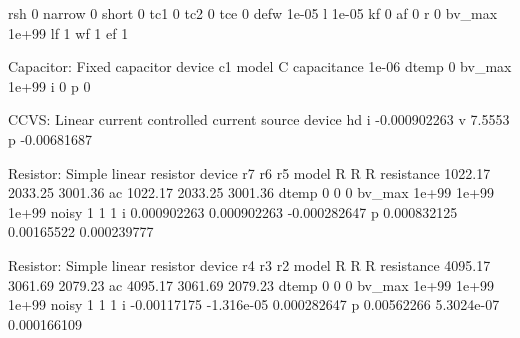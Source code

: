         rsh                     0
     narrow                     0
      short                     0
        tc1                     0
        tc2                     0
        tce                     0
       defw                 1e-05
          l                 1e-05
         kf                     0
         af                     0
          r                     0
     bv_max                 1e+99
         lf                     1
         wf                     1
         ef                     1

 Capacitor: Fixed capacitor
     device                    c1
      model                     C
capacitance                 1e-06
      dtemp                     0
     bv_max                 1e+99
          i                     0
          p                     0

 CCVS: Linear current controlled current source
     device                    hd
          i          -0.000902263
          v                7.5553
          p           -0.00681687

 Resistor: Simple linear resistor
     device                    r7                    r6                    r5
      model                     R                     R                     R
 resistance               1022.17               2033.25               3001.36
         ac               1022.17               2033.25               3001.36
      dtemp                     0                     0                     0
     bv_max                 1e+99                 1e+99                 1e+99
      noisy                     1                     1                     1
          i           0.000902263           0.000902263          -0.000282647
          p           0.000832125            0.00165522           0.000239777

 Resistor: Simple linear resistor
     device                    r4                    r3                    r2
      model                     R                     R                     R
 resistance               4095.17               3061.69               2079.23
         ac               4095.17               3061.69               2079.23
      dtemp                     0                     0                     0
     bv_max                 1e+99                 1e+99                 1e+99
      noisy                     1                     1                     1
          i           -0.00117175            -1.316e-05           0.000282647
          p            0.00562266            5.3024e-07           0.000166109

